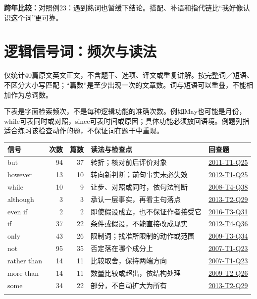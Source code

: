 \documentclass[11pt,a4paper]{article}
\begin{document}
\noindent\textbf{跨年比较：}对照例23：遇到熟词也暂缓下结论。搭配、补语和指代链比“我好像认识这个词”更可靠。\par
\clearpage\section{逻辑信号词：频次与读法}\label{signals}
仅统计40篇原文英文正文，不含题干、选项、译文或重复讲解。按完整词／短语、不区分大小写匹配；“篇数”是至少出现一次的文章数。词与短语可以重叠，不能相加作为总词数。\par
下表是字面检索频次，不是每种逻辑功能的准确次数。例如May也可能是月份，while可表同时或对照，since可表时间或原因；具体功能必须放回语境。例题列指适合练习该检查动作的题，不保证词在题干中重现。\par
\begin{longtable}{@{}p{2.6cm}rrp{6.4cm}p{2.6cm}@{}}\toprule 信号 & 次数 & 篇数 & 读法与检查点 & 回查题\\\midrule\endhead
but & 94 & 37 & 转折；核对前后评价对象 & \hyperref[idx-2011-T1-Q25]{2011-T1-Q25}\\\addlinespace[2pt]
however & 13 & 10 & 转向新判断；前句事实未必失效 & \hyperref[idx-2012-T1-Q25]{2012-T1-Q25}\\\addlinespace[2pt]
while & 10 & 9 & 让步、对照或同时，依句法判断 & \hyperref[idx-2008-T4-Q38]{2008-T4-Q38}\\\addlinespace[2pt]
although & 3 & 3 & 承认一层事实，再看主句落点 & \hyperref[idx-2013-T2-Q29]{2013-T2-Q29}\\\addlinespace[2pt]
even if & 2 & 2 & 即使假设成立，也不保证作者接受它 & \hyperref[idx-2016-T3-Q31]{2016-T3-Q31}\\\addlinespace[2pt]
if & 37 & 22 & 条件或假设，不能直接改成现实 & \hyperref[idx-2012-T4-Q36]{2012-T4-Q36}\\\addlinespace[2pt]
only & 43 & 26 & 限制词；找准所限制的动作或范围 & \hyperref[idx-2009-T3-Q34]{2009-T3-Q34}\\\addlinespace[2pt]
not & 95 & 35 & 否定落在哪个成分上 & \hyperref[idx-2007-T1-Q23]{2007-T1-Q23}\\\addlinespace[2pt]
rather than & 14 & 11 & 比较取舍，保持两端方向 & \hyperref[idx-2007-T1-Q23]{2007-T1-Q23}\\\addlinespace[2pt]
more than & 14 & 11 & 数量比较或超出，依结构处理 & \hyperref[idx-2009-T2-Q26]{2009-T2-Q26}\\\addlinespace[2pt]
some & 34 & 22 & 部分，不自动扩大为所有 & \hyperref[idx-2013-T2-Q29]{2013-T2-Q29}\\\addlinespace[2pt]

\end{longtable}
\end{document}
